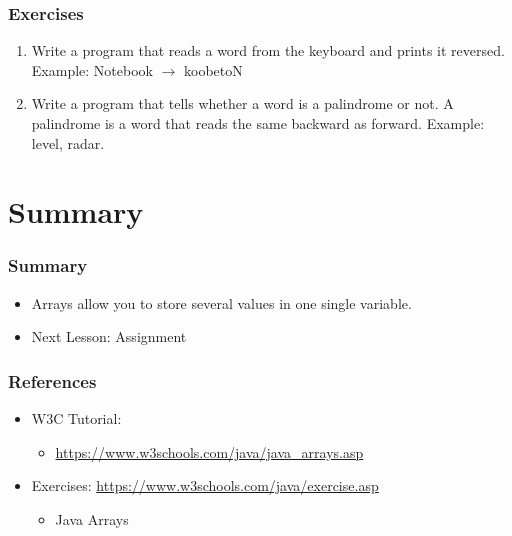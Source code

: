 \documentclass{beamer}
\begin{document}
	\begin{frame}
		\frametitle{Exercises}
		\begin{enumerate}
			\item Write a program that reads a word from the keyboard and prints it reversed. Example: Notebook $\to$ koobetoN
			\item Write a program that tells whether a word is a palindrome or not. A palindrome is a word that reads the same backward as forward. Example: level, radar.
		\end{enumerate}
	\end{frame}



	\section{Summary}
	
	\begin{frame}
		\frametitle{Summary}
		\begin{itemize}
			\item Arrays allow you to store several values in one single variable.
			\item Next Lesson: Assignment
		\end{itemize}
	\end{frame}

	\begin{frame}
		\frametitle{References}
		\begin{itemize}
			\item W3C Tutorial: 
			\begin{itemize}
				\item \url{https://www.w3schools.com/java/java_arrays.asp}
			\end{itemize}
			\item Exercises: \url{https://www.w3schools.com/java/exercise.asp}
			\begin{itemize}
				\item Java Arrays
			\end{itemize}
		\end{itemize}
		
	\end{frame}
\end{document}
